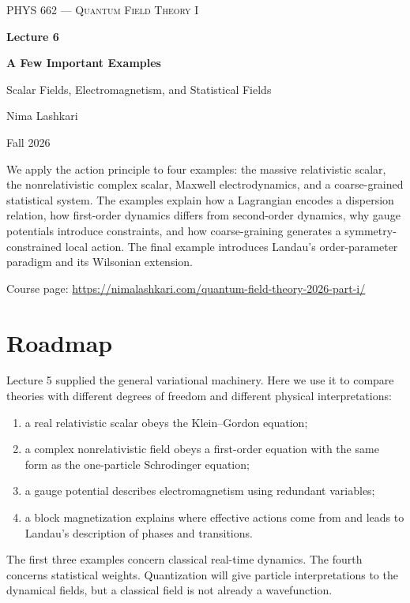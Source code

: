 \documentclass[11pt]{article}
\begin{document}
\begin{titlepage}
\centering
\vspace*{1.2in}
{\scshape\Large PHYS 662 --- Quantum Field Theory I\par}
\vspace{0.35in}
{\Huge\bfseries\color{qftblue} Lecture 6\par}
\vspace{0.15in}
{\LARGE\bfseries A Few Important Examples\par}
\vspace{0.12in}
{\Large\color{qftgreen} Scalar Fields, Electromagnetism, and Statistical Fields\par}
\vspace{0.6in}
{\large Nima Lashkari\par}
{\large Fall 2026\par}
\vfill
\begin{minipage}{0.86\textwidth}
\small
We apply the action principle to four examples: the massive relativistic
scalar, the nonrelativistic complex scalar, Maxwell electrodynamics, and a
coarse-grained statistical system. The examples explain how a Lagrangian
encodes a dispersion relation, how first-order dynamics differs from
second-order dynamics, why gauge potentials introduce constraints, and how
coarse-graining generates a symmetry-constrained local action. The final example
introduces Landau's order-parameter paradigm and its Wilsonian extension.

\medskip
Course page: \url{https://nimalashkari.com/quantum-field-theory-2026-part-i/}
\end{minipage}
\vspace{0.5in}
\end{titlepage}
\tableofcontents
\newpage
{}

\section*{Roadmap}

Lecture 5 supplied the general variational machinery. Here we use it to
compare theories with different degrees of freedom and different physical
interpretations:
\begin{enumerate}
\item a real relativistic scalar obeys the Klein--Gordon equation;
\item a complex nonrelativistic field obeys a first-order equation with the
same form as the one-particle Schrodinger equation;
\item a gauge potential describes electromagnetism using redundant variables;
\item a block magnetization explains where effective actions come from and
leads to Landau's description of phases and transitions.
\end{enumerate}
The first three examples concern classical real-time dynamics. The fourth
concerns statistical weights. Quantization will give particle interpretations
to the dynamical fields, but a classical field is not already a wavefunction.
\end{document}
